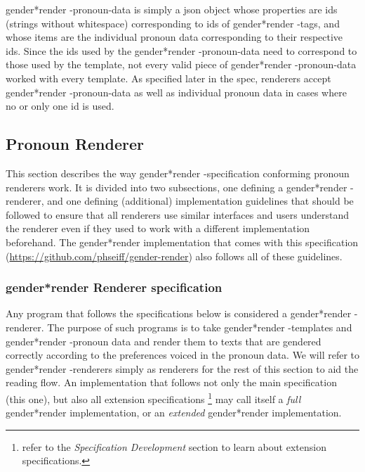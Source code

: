 \documentclass{article}
\newcommand{\GenderRender}{
    gender*render
}
\begin{document}
    \GenderRender-pronoun-data is simply a json object whose properties are ids (strings without whitespace) corresponding to ids of \GenderRender-tags, and whose items are the individual pronoun data corresponding to their respective ids.
    Since the ids used by the \GenderRender-pronoun-data need to correspond to those used by the template, not every valid piece of \GenderRender-pronoun-data worked with every template.
    As specified later in the spec, renderers accept \GenderRender-pronoun-data as well as individual pronoun data in cases where no or only one id is used.

    \subsection{Pronoun Renderer}

    This section describes the way \GenderRender-specification conforming pronoun renderers work.
    It is divided into two subsections, one defining a \GenderRender-renderer, and one defining (additional) implementation guidelines that should be followed to ensure that all renderers use similar interfaces and users understand the renderer even if they used to work with a different implementation beforehand.
    The \GenderRender implementation that comes with this specification (\url{https://github.com/phseiff/gender-render}) also follows all of these guidelines.

    \subsubsection{\GenderRender Renderer specification}

    Any program that follows the specifications below is considered a \GenderRender-renderer.
    The purpose of such programs is to take \GenderRender-templates and \GenderRender-pronoun data and render them to texts that are gendered correctly according to the preferences voiced in the pronoun data.
    We will refer to \GenderRender-renderers simply as renderers for the rest of this section to aid the reading flow.
    An implementation that follows not only the main specification (this one), but also all extension specifications \footnote{refer to the \emph{Specification Development} section to learn about extension specifications.} may call itself a \emph{full} \GenderRender implementation, or an \emph{extended} \GenderRender implementation.\\
\end{document}
